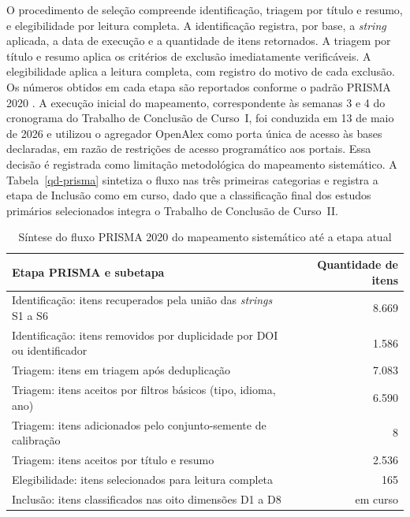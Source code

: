 O procedimento de seleção compreende identificação, triagem por título e resumo, e elegibilidade por leitura completa. A identificação registra, por base, a \emph{string} aplicada, a data de execução e a quantidade de itens retornados. A triagem por título e resumo aplica os critérios de exclusão imediatamente verificáveis. A elegibilidade aplica a leitura completa, com registro do motivo de cada exclusão. Os números obtidos em cada etapa são reportados conforme o padrão PRISMA 2020 \citep{prisma_2020}. A execução inicial do mapeamento, correspondente às semanas 3 e 4 do cronograma do Trabalho de Conclusão de Curso~I, foi conduzida em 13 de maio de 2026 e utilizou o agregador OpenAlex como porta única de acesso às bases declaradas, em razão de restrições de acesso programático aos portais. Essa decisão é registrada como limitação metodológica do mapeamento sistemático. A Tabela~\ref{qd-prisma} sintetiza o fluxo nas três primeiras categorias e registra a etapa de Inclusão como em curso, dado que a classificação final dos estudos primários selecionados integra o Trabalho de Conclusão de Curso~II.

\begin{table}[h]
\captionsetup{type=table, name=Tabela}
\caption{Síntese do fluxo PRISMA 2020 do mapeamento sistemático até a etapa atual}
\centering
\begin{tabular}{p{8cm}r}
\hline
\textbf{Etapa PRISMA e subetapa} & \textbf{Quantidade de itens} \\
\hline
Identificação: itens recuperados pela união das \emph{strings} S1 a S6 & 8.669 \\
Identificação: itens removidos por duplicidade por DOI ou identificador & 1.586 \\
Triagem: itens em triagem após deduplicação & 7.083 \\
Triagem: itens aceitos por filtros básicos (tipo, idioma, ano) & 6.590 \\
Triagem: itens adicionados pelo conjunto-semente de calibração & 8 \\
Triagem: itens aceitos por título e resumo & 2.536 \\
Elegibilidade: itens selecionados para leitura completa & 165 \\
Inclusão: itens classificados nas oito dimensões D1 a D8 & em curso \\
\hline
\end{tabular}
\label{qd-prisma}
\label{tab-ms-execucao}
\end{table}

